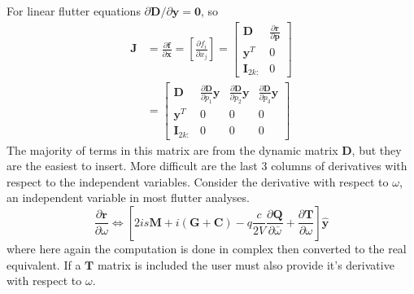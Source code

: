\documentclass[10pt,openany,twoside]{book}
\numberwithin{equation}{section}   %
\newcommand{\Matrix}[1]{\boldsymbol{#1}}
\newcommand{\Vector}[1]{\boldsymbol{#1}}
\begin{document}
For linear flutter equations
$\partial \Matrix{D}/\partial \Vector{y} = \Vector{0}$,
so
\begin{align}
	\Matrix{J} &= \frac{\partial \Vector{f}}{\partial \Vector{x}} =
		\left[\frac{\partial f_i}{\partial x_j}\right]
		= \left[ \begin{array}{cc}
			\Matrix{D} & \frac{\partial \Vector{r}}{\partial \Vector{p}} \\
			\Vector{y}^T & 0 \\
			\Matrix{I}_{2k:} & 0
		\end{array}\right]		\nonumber \\
			&= \left[ \begin{array}{cccc}
				\Matrix{D} & \frac{\partial \Matrix{D}}{\partial p_1}\Vector{y}
					& \frac{\partial \Matrix{D}}{\partial p_2}\Vector{y}
					& \frac{\partial \Matrix{D}}{\partial p_3}\Vector{y}	\\
				\Vector{y}^T & 0 & 0 & 0	\\
				\Matrix{I}_{2k:} & 0 & 0 & 0
		\end{array}\right]
\end{align}
The majority of terms in this matrix are from the dynamic matrix $\Vector{D}$,
but they are the easiest to insert. More difficult are the last 3 columns
of derivatives with respect to the independent variables. Consider
the derivative with respect to $\omega$, an independent variable in most
flutter analyses.
\begin{equation}\label{eqn:jac-omega}
	\frac{\partial \Matrix{r}}{\partial \omega} \Leftrightarrow
		\left[ 2is\Matrix{M} + i\left(\Matrix{G} + \Matrix{C}\right)
			- q\frac{c}{2V}\frac{\partial \Matrix{Q}}{\partial \bar{\omega}}
			+ \frac{\partial \Matrix{T}}{\partial \omega} \right]\hat{\Vector{y}}
\end{equation}
where here again the computation is done in complex then converted to
the real equivalent.
If a $\Matrix{T}$ matrix is included the user must
also provide it's derivative with respect to $\omega$.
\end{document}

